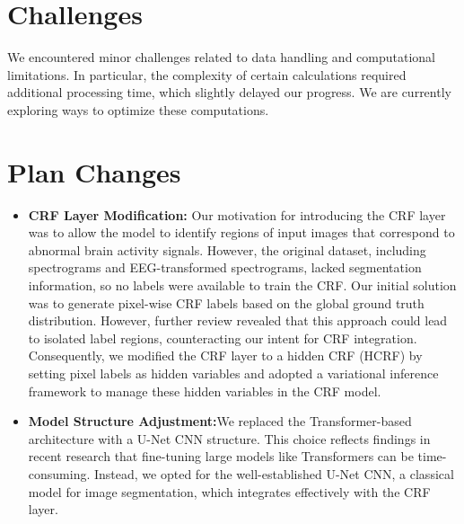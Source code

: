 \documentclass[10pt]{article}
\begin{document}


\section{Challenges}


We encountered minor challenges related to data handling and computational
limitations. In particular, the complexity of certain calculations required
additional processing time, which slightly delayed our progress.
We are currently exploring ways to optimize these computations.


\section{Plan Changes}
	\begin{itemize}
		\item \textbf{CRF Layer Modification:} Our motivation for introducing the CRF layer was to allow the model to identify regions of input 
		images that correspond to abnormal brain activity signals. However, the original dataset, including spectrograms 
		and EEG-transformed spectrograms, lacked segmentation information, so no labels were available to train the CRF. 
		Our initial solution was to generate pixel-wise CRF labels based on the global ground truth distribution. 
		However, further review revealed that this approach could lead to isolated label regions, counteracting 
		our intent for CRF integration. Consequently, we modified the CRF layer to a hidden CRF (HCRF) 
		by setting pixel labels as hidden variables and adopted a variational inference framework to manage
		 these hidden variables in the CRF model.
		\item \textbf{Model Structure Adjustment:}We replaced the Transformer-based architecture with a U-Net CNN structure. This choice reflects 
		findings in recent research that fine-tuning large models like Transformers can be time-consuming. Instead,
		 we opted for the well-established U-Net CNN, a classical model for image segmentation, 
		 which integrates effectively with the CRF layer.
	\end{itemize}
\end{document}

